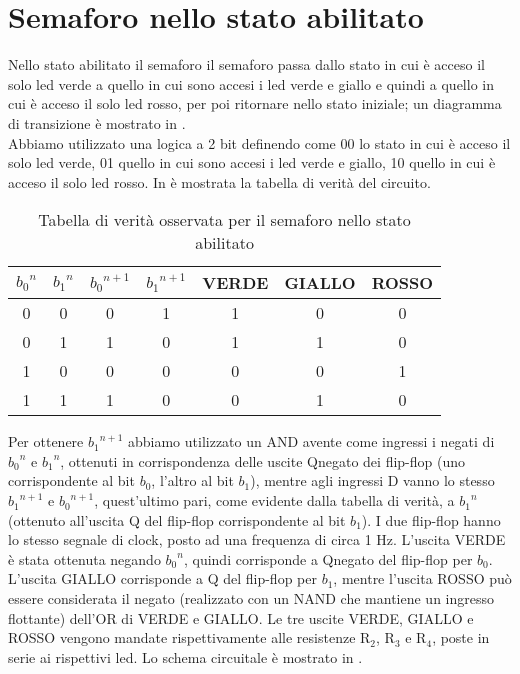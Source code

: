 \section{Semaforo nello stato abilitato}
Nello stato abilitato il semaforo il semaforo passa dallo stato in cui è acceso il solo led verde a quello in cui sono accesi i led verde e giallo e quindi a quello in cui è acceso il solo led rosso, per poi ritornare nello stato iniziale; un diagramma di transizione è mostrato in .\\
Abbiamo utilizzato una logica a 2 bit definendo come 00 lo stato in cui è acceso il solo led verde, 01 quello in cui sono accesi i led verde e giallo, 10 quello in cui è acceso il solo led rosso. In  è mostrata la tabella di verità del circuito.\\
\begin{table}[h]
	\centering
	\begin{tabular}{*{7}{S[table-figures-exponent = 2]}}
		{${b_0}^{n}$} & {${b_1}^{n}$} & {${b_0}^{n+1}$} & {${b_1}^{n+1}$} & {VERDE} & {GIALLO} & {ROSSO} \\
		 & 0 & 0 & 1 & 1 & 0 & 0\\
           0 & 1 & 1 & 0 & 1 & 1 & 0\\
           1 & 0 & 0 & 0 & 0 & 0 & 1\\
           1 & 1 & 1 & 0 & 0 & 1 & 0\\
 	\end{tabular}
	\caption{ Tabella di verità osservata per il semaforo nello stato abilitato}
	\label{t:Tabella-verità}
\end{table}
Per ottenere ${b_1}^{n+1}$ abbiamo utilizzato un AND avente come ingressi i negati di ${b_0}^{n}$ e ${b_1}^{n}$, ottenuti in corrispondenza delle uscite Qnegato dei flip-flop (uno corrispondente al bit $b_0$, l'altro al bit $b_1$), mentre agli ingressi D vanno lo stesso ${b_1}^{n+1}$ e ${b_0}^{n+1}$, quest'ultimo pari, come evidente dalla tabella di verità, a ${b_1}^{n}$ (ottenuto all'uscita Q del flip-flop corrispondente al bit $b_1$). I due flip-flop hanno lo stesso segnale di clock, posto ad una frequenza di circa 1 Hz. L'uscita VERDE è stata ottenuta negando ${b_0}^{n}$, quindi corrisponde a Qnegato del flip-flop per $b_0$. L'uscita GIALLO corrisponde a Q del flip-flop per $b_1$, mentre l'uscita ROSSO può essere considerata il negato (realizzato con un NAND che mantiene un ingresso flottante) dell'OR di VERDE e GIALLO. Le tre uscite VERDE, GIALLO e ROSSO vengono mandate rispettivamente alle resistenze R$_2$, R$_3$ e R$_4$, poste in serie ai rispettivi led. Lo schema circuitale è mostrato in .\\
